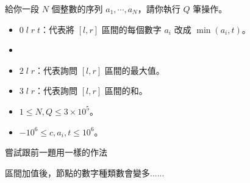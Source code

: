 \begin{frame}{}
    \begin{problem}
        給你一段 $N$ 個整數的序列 $a_1,\cdots,a_N$，請你執行 $Q$ 筆操作。

        \begin{itemize}
            \item $0\;l\;r\;t$：代表將 $[l,r]$ 區間的每個數字 $a_i$ 改成 $\min(a_i,t)$。
            \item {}
            \item $2\;l\;r$：代表詢問 $[l,r]$ 區間的最大值。
            \item $3\;l\;r$：代表詢問 $[l,r]$ 區間的和。
        \end{itemize}

        \begin{itemize}
            \item $1\le N,Q\le 3\times 10^5$。
            \item $-10^6\le c,a_i,t\le 10^6$。
        \end{itemize}
    \end{problem}
\end{frame}

\begin{frame}{}
    嘗試跟前一題用一樣的作法

    區間加值後，節點的數字種類數會變多......\\


\end{frame}

